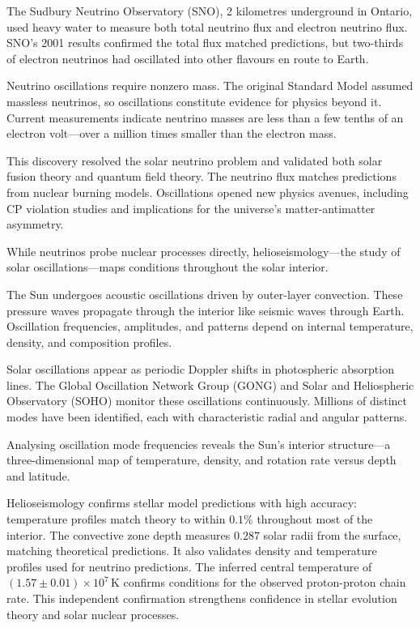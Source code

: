 The Sudbury Neutrino Observatory (SNO), 2 kilometres underground in Ontario, used heavy water to measure both total neutrino flux and electron neutrino flux. SNO's 2001 results confirmed the total flux matched predictions, but two-thirds of electron neutrinos had oscillated into other flavours en route to Earth.

Neutrino oscillations require nonzero mass. The original Standard Model assumed massless neutrinos, so oscillations constitute evidence for physics beyond it. Current measurements indicate neutrino masses are less than a few tenths of an electron volt—over a million times smaller than the electron mass.

This discovery resolved the solar neutrino problem and validated both solar fusion theory and quantum field theory. The neutrino flux matches predictions from nuclear burning models. Oscillations opened new physics avenues, including CP violation studies and implications for the universe's matter-antimatter asymmetry.

While neutrinos probe nuclear processes directly, helioseismology—the study of solar oscillations—maps conditions throughout the solar interior.

The Sun undergoes acoustic oscillations driven by outer-layer convection. These pressure waves propagate through the interior like seismic waves through Earth. Oscillation frequencies, amplitudes, and patterns depend on internal temperature, density, and composition profiles.

Solar oscillations appear as periodic Doppler shifts in photospheric absorption lines. The Global Oscillation Network Group (GONG) and Solar and Heliospheric Observatory (SOHO) monitor these oscillations continuously. Millions of distinct modes have been identified, each with characteristic radial and angular patterns.

Analysing oscillation mode frequencies reveals the Sun's interior structure—a three-dimensional map of temperature, density, and rotation rate versus depth and latitude.

Helioseismology confirms stellar model predictions with high accuracy: temperature profiles match theory to within $0.1\%$ throughout most of the interior. The convective zone depth measures $0.287$ solar radii from the surface, matching theoretical predictions. It also validates density and temperature profiles used for neutrino predictions. The inferred central temperature of $(1.57 \pm 0.01) \times 10^7\,\text{K}$ confirms conditions for the observed proton-proton chain rate. This independent confirmation strengthens confidence in stellar evolution theory and solar nuclear processes.

